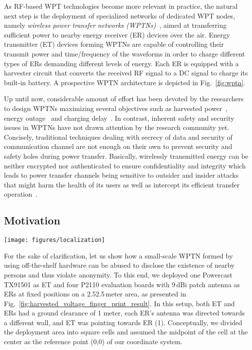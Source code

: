 \documentclass[journal,10pt,draftclsnofoot,onecolumn]{IEEEtran}
\begin{document}
As RF-based WPT technologies become more relevant in practice, the natural next step is the deployment of specialized networks of dedicated WPT nodes, namely \emph{wireless power transfer networks (WPTNs)}~\cite{liu15gwptn}, aimed at transferring sufficient power to nearby energy receiver (ER) devices over the air. Energy transmitter (ET) devices forming WPTNs are capable of controlling their transmit power and time/frequency of the waveforms in order to charge different types of ERs demanding different levels of energy. Each ER is equipped with a harvester circuit that converts the received RF signal to a DC signal to charge its built-in battery. A prospective WPTN architecture is depicted in Fig.~\ref{fig:wptn}.

Up until now, considerable amount of effort has been devoted by the researchers to design WPTNs maximizing several objectives such as harvested power~\cite{krikidis_tcom_2013}, energy outage~\cite{huang_arxiv_2012} and charging delay~\cite{fu_infocom_2013}. In contrast, inherent safety and security issues in WPTNs have not drawn attention by the research community yet. Concisely, traditional techniques dealing with secrecy of data and security of communication channel are not enough on their own to prevent security and safety holes during power transfer. Basically, wirelessly transmitted energy can be neither encrypted nor authenticated to ensure confidentiality and integrity which leads to power transfer channels being sensitive to outsider and insider attacks that might harm the health of its users as well as intercept its efficient transfer operation~\cite{secure_cooperative_kang_2015}. 

\subsection{Motivation}

\begin{figure*}
	\centering
	\texttt{[image: figures/localization]}
	\caption{The measured voltage level at the receiver (ER) when a person is present at different locations of an university office. Each square in each of four heatmaps represents a measured voltage by the harvester (located at the center of a room) with a person located at the marked position. Center square (marked by a black line) represents a measurement with no person present.}
	\label{fig:harvested_voltage_finger_print_result}
\end{figure*}

For the sake of clarification, let us show how a small-scale WPTN formed by using off-the-shelf hardware can be abused to disclose the existence of nearby persons and thus violate anonymity. To this end, we deployed one Powercast TX91501 as ET and four P2110 evaluation boards with 9\,dBi patch antenna as ERs at fixed positions on a 2.52.5\,meter area, as presented in Fig.~\ref{fig:harvested_voltage_finger_print_result}. In this setup, both ET and ERs had a ground clearance of 1 meter, each ER's antenna was directed towards a different wall, and ET was pointing towards ER (1). Conceptually, we divided the deployment area into square cells and assumed the midpoint of the cell at the center as the reference point (0,0) of our coordinate system. 
\end{document}
